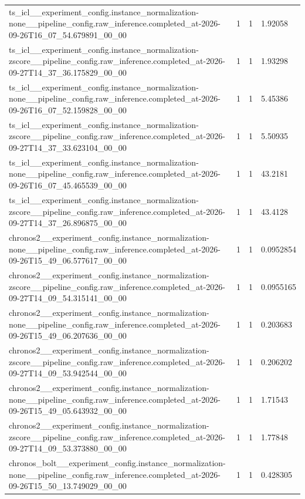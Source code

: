 \begin{tabular}{llll}
ts\_icl\_\_experiment\_config.instance\_normalization-none\_\_pipeline\_config.raw\_inference.completed\_at-2026-09-26T16\_07\_54.679891\_00\_00 & 1 & 1 & 1.92058 \\
ts\_icl\_\_experiment\_config.instance\_normalization-zscore\_\_pipeline\_config.raw\_inference.completed\_at-2026-09-27T14\_37\_36.175829\_00\_00 & 1 & 1 & 1.93298 \\
ts\_icl\_\_experiment\_config.instance\_normalization-none\_\_pipeline\_config.raw\_inference.completed\_at-2026-09-26T16\_07\_52.159828\_00\_00 & 1 & 1 & 5.45386 \\
ts\_icl\_\_experiment\_config.instance\_normalization-zscore\_\_pipeline\_config.raw\_inference.completed\_at-2026-09-27T14\_37\_33.623104\_00\_00 & 1 & 1 & 5.50935 \\
ts\_icl\_\_experiment\_config.instance\_normalization-none\_\_pipeline\_config.raw\_inference.completed\_at-2026-09-26T16\_07\_45.465539\_00\_00 & 1 & 1 & 43.2181 \\
ts\_icl\_\_experiment\_config.instance\_normalization-zscore\_\_pipeline\_config.raw\_inference.completed\_at-2026-09-27T14\_37\_26.896875\_00\_00 & 1 & 1 & 43.4128 \\
chronos2\_\_experiment\_config.instance\_normalization-none\_\_pipeline\_config.raw\_inference.completed\_at-2026-09-26T15\_49\_06.577617\_00\_00 & 1 & 1 & 0.0952854 \\
chronos2\_\_experiment\_config.instance\_normalization-zscore\_\_pipeline\_config.raw\_inference.completed\_at-2026-09-27T14\_09\_54.315141\_00\_00 & 1 & 1 & 0.0955165 \\
chronos2\_\_experiment\_config.instance\_normalization-none\_\_pipeline\_config.raw\_inference.completed\_at-2026-09-26T15\_49\_06.207636\_00\_00 & 1 & 1 & 0.203683 \\
chronos2\_\_experiment\_config.instance\_normalization-zscore\_\_pipeline\_config.raw\_inference.completed\_at-2026-09-27T14\_09\_53.942544\_00\_00 & 1 & 1 & 0.206202 \\
chronos2\_\_experiment\_config.instance\_normalization-none\_\_pipeline\_config.raw\_inference.completed\_at-2026-09-26T15\_49\_05.643932\_00\_00 & 1 & 1 & 1.71543 \\
chronos2\_\_experiment\_config.instance\_normalization-zscore\_\_pipeline\_config.raw\_inference.completed\_at-2026-09-27T14\_09\_53.373880\_00\_00 & 1 & 1 & 1.77848 \\
chronos\_bolt\_\_experiment\_config.instance\_normalization-none\_\_pipeline\_config.raw\_inference.completed\_at-2026-09-26T15\_50\_13.749029\_00\_00 & 1 & 1 & 0.428305 \\

\end{tabular}
